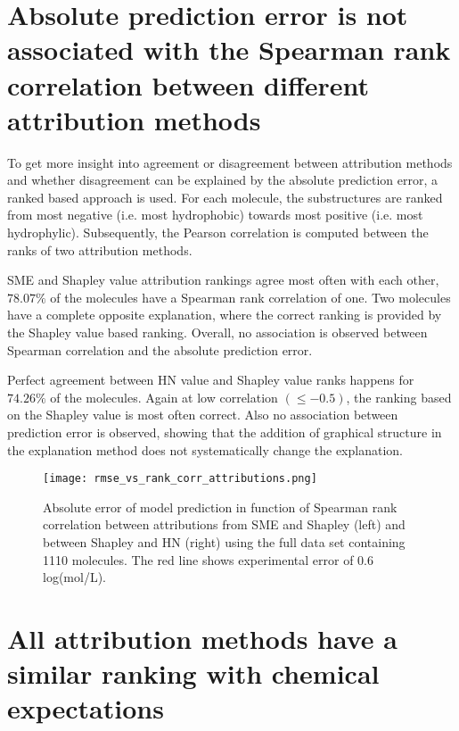 \section{Absolute prediction error is not associated with the Spearman rank correlation between different attribution methods}


To get more insight into agreement or disagreement between attribution methods
and whether disagreement can be explained by the absolute prediction 
error, a ranked based approach is used. For each molecule, the substructures are ranked  
from most negative (i.e. most hydrophobic) towards most positive (i.e. most hydrophylic). 
Subsequently, the Pearson correlation is computed between the ranks of two attribution methods.


SME and Shapley value attribution rankings agree most often with each other, $78.07\%$
of the molecules have a Spearman rank correlation of one. Two molecules have 
a complete opposite explanation, where the correct ranking is provided by the 
Shapley value based ranking. Overall, no association is observed between Spearman 
correlation and the absolute prediction error. 


Perfect agreement between HN value and Shapley value ranks happens for 
$74.26\%$ of the molecules. Again at low correlation $( \le -0.5)$, the ranking based on 
the Shapley value is most often correct. Also no association between prediction error 
is observed, showing that the addition of graphical structure in the explanation 
method does not systematically change the explanation.


 

\begin{figure}[h]
    \centering
    \texttt{[image: rmse\_vs\_rank\_corr\_attributions.png]}
    \caption{Absolute error of model prediction in function of Spearman rank correlation between 
        attributions from SME and Shapley (left) and between Shapley and HN (right) using the full 
        data set containing 1110 molecules. The red line shows experimental error of 0.6 log(mol/L).
    }
\end{figure}


\section{All attribution methods have a similar ranking with chemical expectations}

